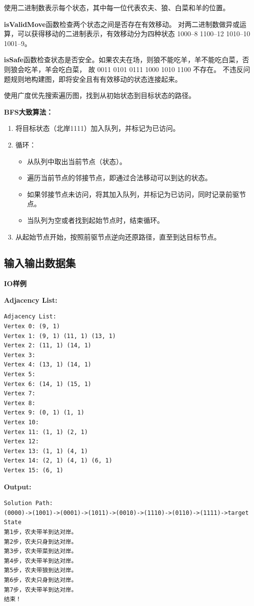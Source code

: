 \documentclass[UTF8]{ctexart}
\begin{document}
    使用二进制数表示每个状态，其中每一位代表农夫、狼、白菜和羊的位置。

    \textbf{isValidMove}函数检查两个状态之间是否存在有效移动。
    对两二进制数做异或运算，可以获得移动的二进制表示，有效移动分为四种状态
    1000--8  1100--12  1010--10  1001--9。

    \textbf{isSafe}函数检查状态是否安全。如果农夫在场，则狼不能吃羊，羊不能吃白菜，否则狼会吃羊，羊会吃白菜，
    故 0011 0101 0111 1000 1010 1100 不存在。
    不违反问题规则地构建图，即将安全且有有效移动的状态连接起来。

    使用广度优先搜索遍历图，找到从初始状态到目标状态的路径。
    
\textbf{BFS大致算法：}
    \begin{enumerate}
        \item 将目标状态（北岸1111）加入队列，并标记为已访问。
        \item 循环：
        \begin{itemize}
            \item 从队列中取出当前节点（状态）。
            \item 遍历当前节点的邻接节点，即通过合法移动可以到达的状态。
            \item 如果邻接节点未访问，将其加入队列，并标记为已访问，同时记录前驱节点。
            \item 当队列为空或者找到起始节点时，结束循环。
         \end{itemize}
        \item 从起始节点开始，按照前驱节点逆向还原路径，直至到达目标节点。
      \end{enumerate}




\subsection*{输入输出数据集}

\textbf{IO样例}
\begin{exampleframe}

\textbf{Adjacency List:}
\begin{verbatim}
Adjacency List:
Vertex 0: (9, 1)
Vertex 1: (9, 1) (11, 1) (13, 1)
Vertex 2: (11, 1) (14, 1)
Vertex 3:
Vertex 4: (13, 1) (14, 1)
Vertex 5:
Vertex 6: (14, 1) (15, 1)
Vertex 7:
Vertex 8:
Vertex 9: (0, 1) (1, 1)
Vertex 10:
Vertex 11: (1, 1) (2, 1)
Vertex 12:
Vertex 13: (1, 1) (4, 1) 
Vertex 14: (2, 1) (4, 1) (6, 1)
Vertex 15: (6, 1)
\end{verbatim}
\textbf{Output:}
\begin{verbatim}
Solution Path:
(0000)->(1001)->(0001)->(1011)->(0010)->(1110)->(0110)->(1111)->target State
第1步，农夫带羊到达对岸。
第2步，农夫只身到达对岸。
第3步，农夫带菜到达对岸。
第4步，农夫带羊到达对岸。
第5步，农夫带狼到达对岸。
第6步，农夫只身到达对岸。
第7步，农夫带羊到达对岸。
结束！
\end{verbatim}
\end{exampleframe}
    
\end{document}
